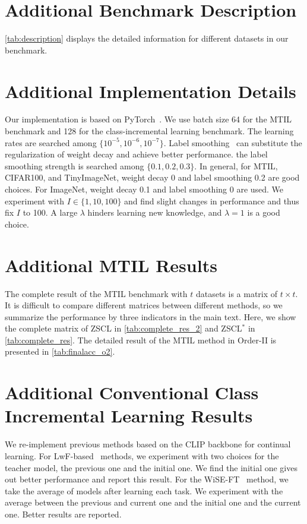 \section{Additional Benchmark Description}
\label{sec:dcd}

\cref{tab:description} displays the detailed information for different datasets in our benchmark.

\section{Additional Implementation Details}
\label{sec:addid}

Our implementation is based on PyTorch~\cite{NEURIPS2019_9015}. We use batch size 64 for the MTIL benchmark and 128 for the class-incremental learning benchmark. The learning rates are searched among $\{10^{-5},10^{-6},10^{-7}\}$. Label smoothing~\cite{muller2019does} can substitute the regularization of weight decay and achieve better performance. the label smoothing strength is searched among $\{0.1,0.2,0.3\}$. In general, for MTIL, CIFAR100, and TinyImageNet, weight decay 0 and label smoothing 0.2 are good choices. For ImageNet, weight decay 0.1 and label smoothing 0 are used. We experiment with $I\in\{1,10,100\}$ and find slight changes in performance and thus fix $I$ to 100. A large $\lambda$ hinders learning new knowledge, and $\lambda=1$ is a good choice.

\section{Additional MTIL Results}

The complete result of the MTIL benchmark with $t$ datasets is a matrix of $t\times t$. It is difficult to compare different matrices between different methods, so we summarize the performance by three indicators in the main text. Here, we show the complete matrix of ZSCL in \cref{tab:complete_res_2} and ZSCL$^*$ in \cref{tab:complete_res}.  The detailed result of the MTIL method in Order-II is presented in \cref{tab:finalacc_o2}.



\section{Additional Conventional Class Incremental Learning Results}

We re-implement previous methods based on the CLIP backbone for continual learning. For LwF-based~\cite{li2019learn,ding2022don} methods, we experiment with two choices for the teacher model, the previous one and the initial one. We find the initial one gives out better performance and report this result. For the WiSE-FT~\cite{wortsman2022robust} method, we take the average of models after learning each task. We experiment with the average between the previous and current one and the initial one and the current one. Better results are reported.

